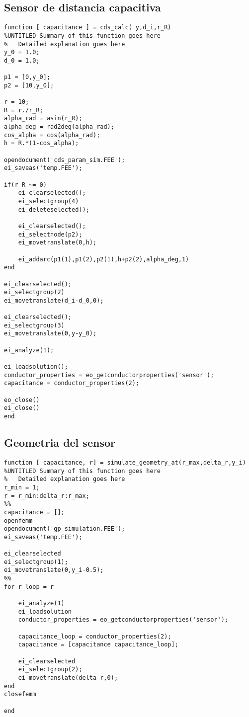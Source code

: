 \subsection{Sensor de distancia capacitiva}

\begin{lstlisting}[frame=single]
function [ capacitance ] = cds_calc( y,d_i,r_R)
%UNTITLED Summary of this function goes here
%   Detailed explanation goes here
y_0 = 1.0;
d_0 = 1.0;

p1 = [0,y_0];
p2 = [10,y_0];

r = 10;
R = r./r_R;
alpha_rad = asin(r_R);
alpha_deg = rad2deg(alpha_rad);
cos_alpha = cos(alpha_rad);
h = R.*(1-cos_alpha);

opendocument('cds_param_sim.FEE');
ei_saveas('temp.FEE');

if(r_R ~= 0)
    ei_clearselected();
    ei_selectgroup(4)
    ei_deleteselected();

    ei_clearselected();
    ei_selectnode(p2);
    ei_movetranslate(0,h);

    ei_addarc(p1(1),p1(2),p2(1),h+p2(2),alpha_deg,1)
end

ei_clearselected();
ei_selectgroup(2)
ei_movetranslate(d_i-d_0,0);

ei_clearselected();
ei_selectgroup(3)
ei_movetranslate(0,y-y_0);

ei_analyze(1);

ei_loadsolution();
conductor_properties = eo_getconductorproperties('sensor');
capacitance = conductor_properties(2);

eo_close()
ei_close()
end

\end{lstlisting}

\subsection{Geometria del sensor}

\begin{lstlisting}[frame=single]
function [ capacitance, r] = simulate_geometry_at(r_max,delta_r,y_i)
%UNTITLED Summary of this function goes here
%   Detailed explanation goes here
r_min = 1;
r = r_min:delta_r:r_max;
%%
capacitance = [];
openfemm
opendocument('gp_simulation.FEE');
ei_saveas('temp.FEE');

ei_clearselected
ei_selectgroup(1);
ei_movetranslate(0,y_i-0.5);
%%
for r_loop = r
    
    ei_analyze(1)
    ei_loadsolution
    conductor_properties = eo_getconductorproperties('sensor');
    
    capacitance_loop = conductor_properties(2);
    capacitance = [capacitance capacitance_loop]; 
    
    ei_clearselected
    ei_selectgroup(2);
    ei_movetranslate(delta_r,0);
end
closefemm

end

\end{lstlisting}

